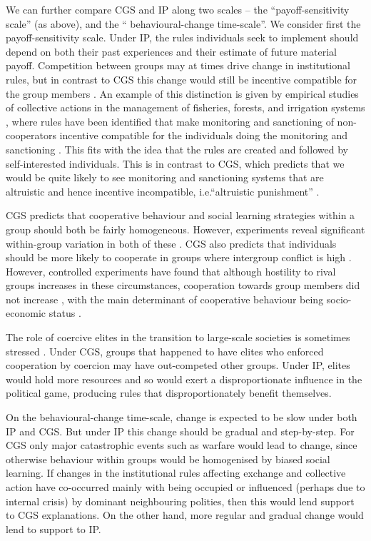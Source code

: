 \documentclass[10pt, a4paper, fleqn]{article}
\begin{document}
We can further compare CGS and IP along two scales -- the ``payoff-sensitivity scale'' (as above), and the `` behavioural-change time-scale''.  We consider first the payoff-sensitivity scale. Under IP, the rules individuals seek to implement should depend on both their past experiences and their estimate of future material payoff. Competition between groups may at times drive change in institutional rules, but in contrast to CGS this change would still be incentive compatible for the group members \citep{Binmore:2005:a,Binmore:2014:a,Ober:2008:a}. An example of this distinction is given by empirical studies of collective actions in the management of fisheries, forests, and irrigation systems \citep{Ostrom:1990:a}, where rules have been identified that make monitoring and sanctioning of non-cooperators incentive compatible for the individuals doing the monitoring and sanctioning \citep{Baumard:2010:a,Guala:2012:a}. This fits with the idea that the rules are created and followed by self-interested individuals. This is in contrast to CGS, which predicts that we would be quite likely to see monitoring and sanctioning systems that are altruistic and hence incentive incompatible, i.e.``altruistic punishment'' \citep{Fehr:2002:b,Boyd:2003:a}. 

CGS predicts that cooperative behaviour and social learning strategies within a group should both be fairly homogeneous. However, experiments reveal significant within-group variation in both of these \citep{Lamba:2011:a,Molleman:2014:a}. CGS also predicts that individuals should be more likely to cooperate in groups where intergroup conflict is high \citep{Bowles:2003:a,Choi:2007:a,Garcia:2011:a}. However, controlled experiments have found that although hostility to rival groups increases in these circumstances, cooperation towards group members did not increase \citep{Silva:2015:a}, with the main determinant of cooperative behaviour being socio-economic status \citep{Silva:2014:a}.

The role of coercive elites in the transition to large-scale societies is sometimes stressed \citep{Seabright:2013:a,Sterelny:2014:a}. Under CGS, groups that happened to have elites who enforced cooperation by coercion may have out-competed other groups.  Under IP, elites would hold more resources and so would exert a disproportionate influence in the political game, producing rules that disproportionately benefit themselves. 

On the behavioural-change time-scale, change is expected to be slow under both IP and CGS. But under IP this change should be gradual and step-by-step. For CGS only major catastrophic events such as warfare would lead to change, since otherwise behaviour within groups would be homogenised by biased social learning. If changes in the institutional rules affecting exchange and collective action have co-occurred mainly with being occupied or influenced (perhaps due to internal crisis) by dominant neighbouring polities, then this would lend support to CGS explanations. On the other hand, more regular and gradual change would lend to support to IP. 
\end{document}
